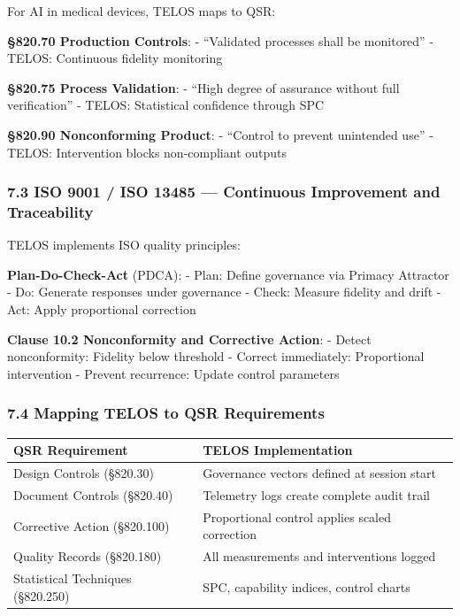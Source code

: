 For AI in medical devices, TELOS maps to QSR:

\textbf{§820.70 Production Controls}: - ``Validated processes shall be
monitored'' - TELOS: Continuous fidelity monitoring

\textbf{§820.75 Process Validation}: - ``High degree of assurance
without full verification'' - TELOS: Statistical confidence through SPC

\textbf{§820.90 Nonconforming Product}: - ``Control to prevent
unintended use'' - TELOS: Intervention blocks non-compliant outputs

\subsubsection{7.3 ISO 9001 / ISO 13485 --- Continuous Improvement and
Traceability}\label{iso-9001-iso-13485-continuous-improvement-and-traceability}

TELOS implements ISO quality principles:

\textbf{Plan-Do-Check-Act} (PDCA): - Plan: Define governance via Primacy
Attractor - Do: Generate responses under governance - Check: Measure
fidelity and drift - Act: Apply proportional correction

\textbf{Clause 10.2 Nonconformity and Corrective Action}: - Detect
nonconformity: Fidelity below threshold - Correct immediately:
Proportional intervention - Prevent recurrence: Update control
parameters

\subsubsection{7.4 Mapping TELOS to QSR
Requirements}\label{mapping-telos-to-qsr-requirements}

{\def\LTcaptype{none} %
\begin{longtable}[]{@{}
  >{\raggedright\arraybackslash}p{}
  >{\raggedright\arraybackslash}p{}@{}}
\toprule\noalign{}
\begin{minipage}[b]{\linewidth}\raggedright
QSR Requirement
\end{minipage} & \begin{minipage}[b]{\linewidth}\raggedright
TELOS Implementation
\end{minipage} \\
\midrule\noalign{}
\endhead
\bottomrule\noalign{}
\endlastfoot
Design Controls (§820.30) & Governance vectors defined at session
start \\
Document Controls (§820.40) & Telemetry logs create complete audit
trail \\
Corrective Action (§820.100) & Proportional control applies scaled
correction \\
Quality Records (§820.180) & All measurements and interventions
logged \\
Statistical Techniques (§820.250) & SPC, capability indices, control
charts \\
\end{longtable}
}

